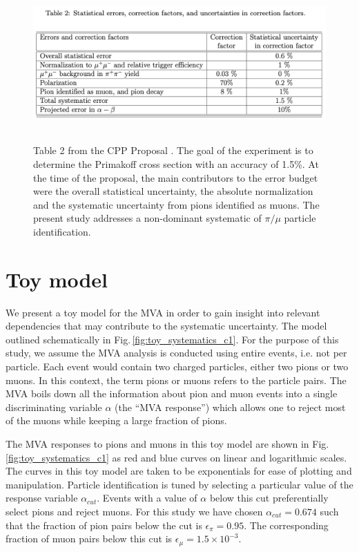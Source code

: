 \documentclass[12pt]{article}
\begin{document}
\begin{figure}[tbph]
\begin{center}
\includegraphics[height=6cm,clip=true]{Proposal_Table2}
\caption{Table 2 from the CPP Proposal \cite{CPPexp}. The goal of the experiment is to determine the Primakoff cross section with
an accuracy of 1.5\%. At the time of the proposal, the main contributors to the error budget were the overall statistical uncertainty, the absolute
normalization and the systematic uncertainty from pions identified as muons. The present study addresses a non-dominant systematic of 
$\pi/\mu$ particle identification.
\label{fig:Proposal_Table2}}
\end{center}
\end{figure} 

\section{Toy model}
We present a toy model for the MVA in order to gain insight into relevant dependencies that may contribute to the systematic uncertainty.  The model outlined schematically in Fig.\,\ref{fig:toy_systematics_c1}. For the purpose of this study, we assume the MVA analysis is conducted using entire events, i.e. not per particle. Each event would contain two charged particles, either two pions or two muons. In this context, the term pions or muons refers to the particle pairs. The MVA boils down all the information about pion and muon events into a single discriminating variable $\alpha$ (the ``MVA response'') which allows one to reject most of the muons while keeping a large fraction of pions.

The MVA responses to pions and muons in this toy model are shown in Fig.\,\ref{fig:toy_systematics_c1} as red and blue curves on linear and logarithmic scales. The curves in this toy model are taken to be exponentials for ease of plotting and manipulation. Particle identification is tuned by selecting a particular value of the response variable 
$\alpha_{cut}$. Events with a value of $\alpha$ below this cut preferentially select pions and reject muons. For this study we have chosen
$\alpha_{cut}=0.674$ such that the fraction of pion pairs below the cut is $\epsilon_{\pi} = 0.95$. The corresponding fraction of muon pairs below this cut 
is $\epsilon_{\mu} = 1.5 \times 10^{-3}$.
\end{document}
